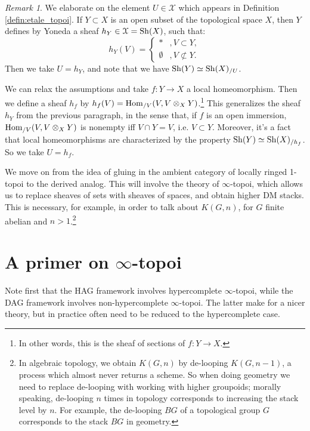 \documentclass[10pt,a4paper,reqno,oneside]{book} %
\theoremstyle{plain}
\theoremstyle{definition}
\theoremstyle{remark}
\newtheorem{rem}[thm]{Remark}
\numberwithin{equation}{section}
\begin{document}
\begin{rem}
We elaborate on the element $U \in \mathcal{X}$ which appears in Definition \ref{defin:etale_topoi}. If $Y \subset X$ is an
open subset of the topological space $X$, then $Y$ defines by Yoneda a sheaf $h_Y \in \mathcal{X} = \mathrm{Sh}(X)$, such that:
\[
h_Y(V) = \left\{ \begin{array} {ll} * & ,V \subset Y, \\ \emptyset &, V\not \subset Y. \end{array}\right.
\]
Then we take $U = h_Y$, and note that we have $\mathrm{Sh}(Y) \simeq \mathrm{Sh}(X)_{/U}$.

We can relax the assumptions and take $f:Y \to X$ a local homeomorphism. Then we define a sheaf $h_f$ by
$h_f(V) = \operatorname{Hom}_{/V}(V,V \otimes_X Y)$.\footnote{In other words, this is the sheaf of sections of $f:Y \to X$.}
 This generalizes the sheaf $h_Y$ from the previous paragraph, in the sense that,
if $f$ is an open immersion, $\operatorname{Hom}_{/V}(V,V \otimes_X Y)$ is nonempty iff $V\cap Y = V$, i.e. $V \subset Y$.
Moreover, it's a fact that local homeomorphisms are characterized by the property $\mathrm{Sh}(Y) \simeq \mathrm{Sh}(X)_{/h_f}$. So
we take $U = h_f$.
\end{rem}

We move on from the idea of gluing in the ambient category of locally ringed 1-topoi to the derived analog. This
will involve the theory of $\infty$-topoi, which allows us to replace sheaves of sets with sheaves of spaces,
and obtain higher DM stacks. This is necessary, for example, in order to talk about $K(G,n)$, for $G$ finite abelian
and $n>1$.\footnote{In algebraic topology, we obtain $K(G,n)$ by de-looping $K(G,n-1)$, a process which almost never
returns a scheme. So when doing geometry we need to replace de-looping with working with higher groupoids; morally
speaking, de-looping $n$ times in topology corresponds to increasing the stack level by $n$. For example, the de-looping
$BG$ of a topological group $G$ corresponds to the stack $BG$ in geometry.}


\section{A primer on $\infty$-topoi}
Note first that the HAG framework \cite{HAG-I} involves hypercomplete $\infty$-topoi, while the DAG framework
\cite{Lurie_DAG_V} involves non-hypercomplete 
$\infty$-topoi. The latter make for a nicer theory, but in practice often need to be reduced to the hypercomplete case.
\end{document}
